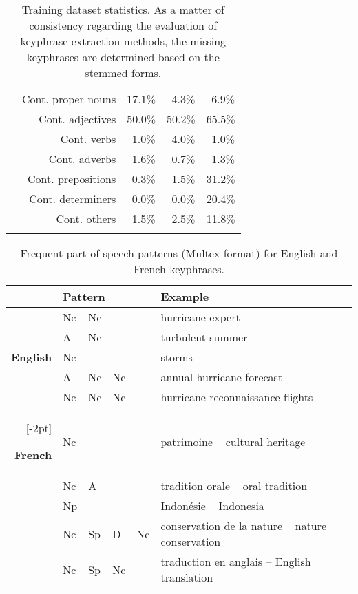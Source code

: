 \begin{table}[h]
\begin{tabular}{@{~}r@{~}r@{~}c@{~}c@{~}c@{~}}
        & Cont. proper nouns & 17.1\% & $~~$4.3\% & $~~$6.9\%\\
        & Cont. adjectives & 50.0\% & 50.2\% & 65.5\%\\
        & Cont. verbs & $~~$1.0\% & $~~$4.0\% & $~~$1.0\%\\
        & Cont. adverbs & $~~$1.6\% & $~~$0.7\% & $~~$1.3\%\\
        & Cont. prepositions & $~~$0.3\% & $~~$1.5\% & 31.2\%\\
        & Cont. determiners & $~~$0.0\% & $~~$0.0\% & 20.4\%\\
        & Cont. others & $~~$1.5\% & $~~$2.5\% & 11.8\%\\
        \addlinespace[.5\defaultaddspace]
        \bottomrule
      \end{tabular}
      \caption{Training dataset statistics. As a matter of consistency regarding
               the evaluation of keyphrase extraction methods, the missing
               keyphrases are determined based on the stemmed forms.
               \label{tab:train_dataset_statistics}}
    \end{table}

    \begin{table*}
      \centering
      \begin{tabular}{rlllll}
        \toprule
        & \multicolumn{4}{l}{\textbf{Pattern}} & \textbf{Example}\\
        \midrule
        \multirow{5}{*}[-2pt]{\begin{sideways}\textbf{English}\end{sideways}} & Nc & Nc & & & hurricane expert\\ %
        & A & Nc & & & turbulent summer\\ %
        & Nc & & & & storms\\ %
        & A & Nc & Nc & & annual hurricane forecast\\ %
        & Nc & Nc & Nc & & hurricane reconnaissance flights\\ %
        \addlinespace[1.5\defaultaddspace]
        \multirow{5}{*}[-2pt]{\begin{sideways}\textbf{French}\end{sideways}} & Nc & & & & patrimoine -- cultural heritage\\ %
        & Nc & A & & & tradition orale -- oral tradition\\ %
        & Np & & & & Indonésie -- Indonesia\\ %
        & Nc & Sp & D & Nc & conservation de la nature -- nature conservation\\ %
        & Nc & Sp & Nc & & traduction en anglais -- English translation\\ %
        \bottomrule
      \end{tabular}
      \caption{Frequent part-of-speech patterns (Multex format) for English and
               French keyphrases. \label{tab:best_patterns}}
    \end{table*}

